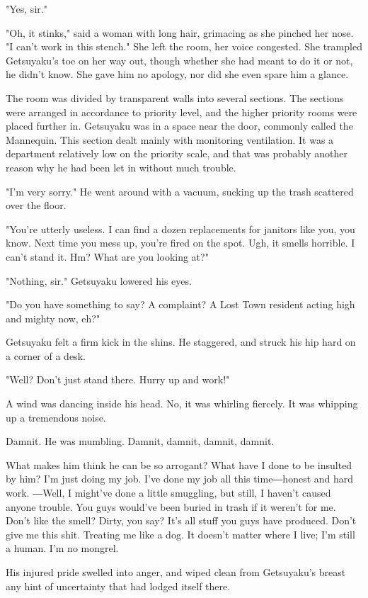 "Yes, sir."

"Oh, it stinks," said a woman with long hair, grimacing as she pinched
her nose. "I can't work in this stench." She left the room, her voice
congested. She trampled Getsuyaku's toe on her way out, though whether
she had meant to do it or not, he didn't know. She gave him no apology,
nor did she even spare him a glance.

The room was divided by transparent walls into several sections. The
sections were arranged in accordance to priority level, and the higher
priority rooms were placed further in. Getsuyaku was in a space near the
door, commonly called the Mannequin. This section dealt mainly with
monitoring ventilation. It was a department relatively low on the
priority scale, and that was probably another reason why he had been let
in without much trouble.

"I'm very sorry." He went around with a vacuum, sucking up the trash
scattered over the floor.

"You're utterly useless. I can find a dozen replacements for janitors
like you, you know. Next time you mess up, you're fired on the spot.
Ugh, it smells horrible. I can't stand it. Hm? What are you looking at?"

"Nothing, sir." Getsuyaku lowered his eyes.

"Do you have something to say? A complaint? A Lost Town resident acting
high and mighty now, eh?"

Getsuyaku felt a firm kick in the shins. He staggered, and struck his
hip hard on a corner of a desk.

"Well? Don't just stand there. Hurry up and work!"

A wind was dancing inside his head. No, it was whirling fiercely. It was
whipping up a tremendous noise.

Damnit. He was mumbling. Damnit, damnit, damnit, damnit.

What makes him think he can be so arrogant? What have I done to be
insulted by him? I'm just doing my job. I've done my job all this
time―honest and hard work. ―Well, I might've done a little smuggling,
but still, I haven't caused anyone trouble. You guys would've been
buried in trash if it weren't for me. Don't like the smell? Dirty, you
say? It's all stuff you guys have produced. Don't give me this shit.
Treating me like a dog. It doesn't matter where I live; I'm still a
human. I'm no mongrel.

His injured pride swelled into anger, and wiped clean from Getsuyaku's
breast any hint of uncertainty that had lodged itself there.

